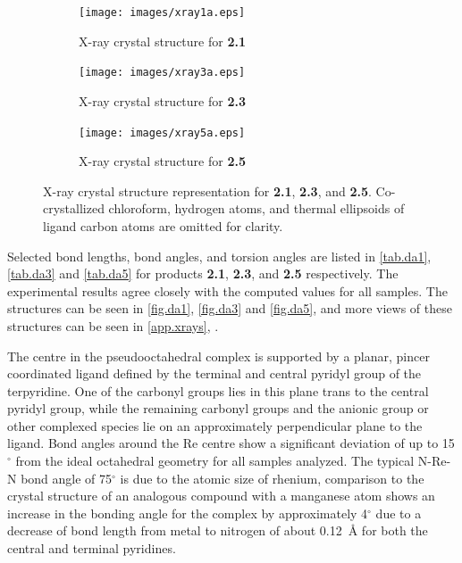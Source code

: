 \begin{figure}[!ht]
 \centering
 \begin{subfigure}[b]{0.49\textwidth}
  \texttt{[image: images/xray1a.eps]}
  \caption{X-ray crystal structure for \textbf{2.1}}
  \label{fig.da1}
 \end{subfigure}
 \begin{subfigure}[b]{0.49\textwidth}
  \texttt{[image: images/xray3a.eps]}
  \caption{X-ray crystal structure for \textbf{2.3}}
  \label{fig.da3}
 \end{subfigure}
 \begin{subfigure}[b]{0.49\textwidth}
  \texttt{[image: images/xray5a.eps]}
  \caption{X-ray crystal structure for \textbf{2.5}}
  \label{fig.da5}
 \end{subfigure}
\caption[X-ray crystal structure representation for \textbf{2.1}, \textbf{2.3} and \textbf{2.5}.]{X-ray crystal structure representation for \textbf{2.1}, \textbf{2.3}, and \textbf{2.5}. Co-crystallized chloroform, hydrogen atoms, and thermal ellipsoids of ligand carbon atoms are omitted for clarity.}
\label{fig.xraybid}
\end{figure}

Selected bond lengths, bond angles, and torsion angles are listed in \autoref{tab.da1}, \autoref{tab.da3} and \autoref{tab.da5} for products \textbf{2.1}, \textbf{2.3}, and \textbf{2.5} respectively. The experimental results agree closely with the computed values for all samples. The structures can be seen in \autoref{fig.da1}, \autoref{fig.da3} and \autoref{fig.da5}, and more views of these structures can be seen in \autoref{app.xrays}, . 

The  centre in the pseudooctahedral complex is supported by a planar, pincer coordinated ligand defined by the terminal and central pyridyl group of the terpyridine. One of the carbonyl groups lies in this plane trans to the central pyridyl group, while the remaining carbonyl groups and the anionic group or other complexed species lie on an approximately perpendicular plane to the ligand. Bond angles around the Re centre show a significant deviation of up to 15$^\circ$ from the ideal octahedral geometry for all samples analyzed. The typical N-Re-N bond angle of 75$^\circ$ is due to the atomic size of rhenium, comparison to the crystal structure of an analogous compound with a manganese atom\autocite{compain2014} shows an increase in the bonding angle for the  complex by approximately 4$^\circ$ due to a decrease of bond length from metal to nitrogen of about 0.12~\r{A} for both the central and terminal pyridines. 

